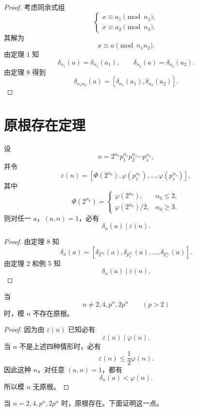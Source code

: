 \begin{proof}
	考虑同余式组
	\[
	\begin{cases}
		x\equiv a_1\pmod {n_1},\\
		x\equiv a_2\pmod {n_2}.
	\end{cases}
	\]
	其解为
	\[
		x\equiv a\pmod {n_1n_2}.
	\]
	由定理 1 知
	\[
		\delta_{n_1}(a)=\delta_{n_1}(a_1),
		\qquad
		\delta_{n_2}(a)=\delta_{n_2}(a_2).
	\]
	由定理 8 得到
	\[
		\delta_{n_1n_2}(a)=[\delta_{n_1}(a_1),\delta_{n_2}(a_2)].
	\]
\end{proof}

\section{原根存在定理}

\begin{theorem}[原文 定理 10]
	设
	\[
		n=2^{\alpha_0}p_1^{\alpha_1}p_2^{\alpha_2}\cdots p_s^{\alpha_s},
	\]
	并令
	\[
		\varepsilon(n)
		=
		[\Phi(2^{\alpha_0}),\varphi(p_1^{\alpha_1}),\ldots,\varphi(p_s^{\alpha_s})],
	\]
	其中
	\[
		\Phi(2^{\alpha_0})
		=
		\begin{cases}
			\varphi(2^{\alpha_0}), & \alpha_0\leq 2,\\
			\varphi(2^{\alpha_0})/2, & \alpha_0\geq 3.
		\end{cases}
	\]
	则对任一 $a$，$(a,n)=1$，必有
	\[
		\delta_n(a)\mid \varepsilon(n).
	\]
\end{theorem}

\begin{proof}
	由定理 8 知
	\[
		\delta_n(a)
		=
		[\delta_{2^{\alpha_0}}(a),\delta_{p_1^{\alpha_1}}(a),\ldots,
		\delta_{p_s^{\alpha_s}}(a)].
	\]
	由定理 2 和例 5 知
	\[
		\delta_n(a)\mid \varepsilon(n).
	\]
\end{proof}

\begin{corollary}[原文 推论 4]
	当
	\[
		n\neq 2,4,p^\alpha,2p^\alpha\qquad (p>2)
	\]
	时，模 $n$ 不存在原根。
\end{corollary}

\begin{proof}
	因为由 $\varepsilon(n)$ 已知必有
	\[
		\varepsilon(n)\mid \varphi(n).
	\]
	当 $n$ 不是上述四种情形时，必有
	\[
		\varepsilon(n)\leq \frac12\varphi(n).
	\]
	因此这种 $n$，对任意 $(a,n)=1$，都有
	\[
		\delta_n(a)<\varphi(n).
	\]
	所以模 $n$ 无原根。
\end{proof}

当 $n=2,4,p^\alpha,2p^\alpha$ 时，原根存在。下面证明这一点。

